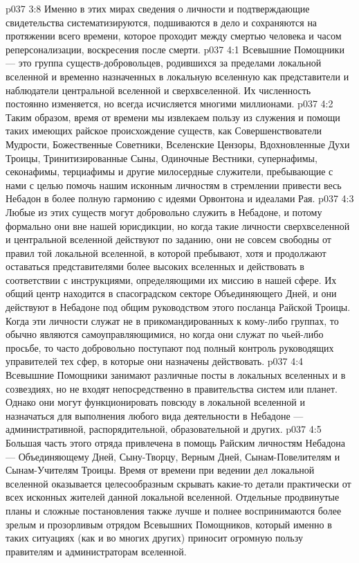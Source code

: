 \vs p037 3:8 Именно в этих мирах сведения о личности и подтверждающие свидетельства систематизируются, подшиваются в дело и сохраняются на протяжении всего времени, которое проходит между смертью человека и часом реперсонализации, воскресения после смерти.
\vs p037 4:1 Всевышние Помощники --- это группа существ\hyp{}добровольцев, родившихся за пределами локальной вселенной и временно назначенных в локальную вселенную как представители и наблюдатели центральной вселенной и сверхвселенной. Их численность постоянно изменяется, но всегда исчисляется многими миллионами.
\vs p037 4:2 Таким образом, время от времени мы извлекаем пользу из служения и помощи таких имеющих райское происхождение существ, как Совершенствователи Мудрости, Божественные Советники, Вселенские Цензоры, Вдохновленные Духи Троицы, Тринитизированные Сыны, Одиночные Вестники, супернафимы, секонафимы, терциафимы и другие милосердные служители, пребывающие с нами с целью помочь нашим исконным личностям в стремлении привести весь Небадон в более полную гармонию с идеями Орвонтона и идеалами Рая.
\vs p037 4:3 Любые из этих существ могут добровольно служить в Небадоне, и потому формально они вне нашей юрисдикции, но когда такие личности сверхвселенной и центральной вселенной действуют по заданию, они не совсем свободны от правил той локальной вселенной, в которой пребывают, хотя и продолжают оставаться представителями более высоких вселенных и действовать в соответствии с инструкциями, определяющими их миссию в нашей сфере. Их общий центр находится в спасоградском секторе Объединяющего Дней, и они действуют в Небадоне под общим руководством этого посланца Райской Троицы. Когда эти личности служат не в прикомандированных к кому\hyp{}либо группах, то обычно являются самоуправляющимися, но когда они служат по чьей\hyp{}либо просьбе, то часто добровольно поступают под полный контроль руководящих управителей тех сфер, в которые они назначены действовать.
\vs p037 4:4 Всевышние Помощники занимают различные посты в локальных вселенных и в созвездиях, но не входят непосредственно в правительства систем или планет. Однако они могут функционировать повсюду в локальной вселенной и назначаться для выполнения любого вида деятельности в Небадоне --- административной, распорядительной, образовательной и других.
\vs p037 4:5 Большая часть этого отряда привлечена в помощь Райским личностям Небадона --- Объединяющему Дней, Сыну\hyp{}Творцу, Верным Дней, Сынам\hyp{}Повелителям и Сынам\hyp{}Учителям Троицы. Время от времени при ведении дел локальной вселенной оказывается целесообразным скрывать какие\hyp{}то детали практически от всех исконных жителей данной локальной вселенной. Отдельные продвинутые планы и сложные постановления также лучше и полнее воспринимаются более зрелым и прозорливым отрядом Всевышних Помощников, который именно в таких ситуациях (как и во многих других) приносит огромную пользу правителям и администраторам вселенной.
